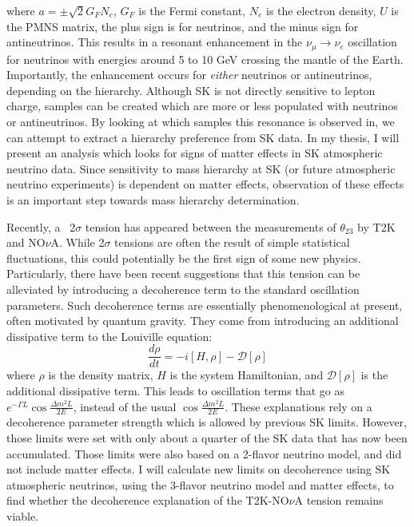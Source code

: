 \documentclass[12pt,oneside,openright]{article}
\begin{document}
where $a=\pm\sqrt{2}G_FN_e$, $G_F$ is the Fermi constant, $N_e$ is the electron density, $U$ is the PMNS matrix, the plus sign is for neutrinos, and the minus sign for antineutrinos.  This results in a resonant enhancement in the $\nu_\mu \rightarrow \nu_e$ oscillation for neutrinos with energies around 5 to 10 GeV crossing the mantle of the Earth.  Importantly, the enhancement occurs for \emph{either} neutrinos or antineutrinos, depending on the hierarchy.  Although SK is not directly sensitive to lepton charge, samples can be created which are more or less populated with neutrinos or antineutrinos.  By looking at which samples this resonance is observed in, we can attempt to extract a hierarchy preference from SK data.  In my thesis, I will present an analysis which looks for signs of matter effects in SK atmospheric neutrino data.  Since sensitivity to mass hierarchy at SK (or future atmospheric neutrino experiments) is dependent on matter effects, observation of these effects is an important step towards mass hierarchy determination.\par
Recently, a ~2$\sigma$ tension has appeared between the measurements of $\theta_{23}$ by T2K and NO$\nu$A.  While 2$\sigma$ tensions are often the result of simple statistical fluctuations, this could potentially be the first sign of some new physics.  Particularly, there have been recent suggestions that this tension can be alleviated by introducing a decoherence term to the standard oscillation parameters.  Such decoherence terms are essentially phenomenological at present, often motivated by quantum gravity.  They come from introducing an additional dissipative term to the Louiville equation:
\begin{equation}
\frac{d\rho}{dt}=-i[H,\rho]-\mathcal{D}[\rho]
\end{equation}
where $\rho$ is the density matrix, $H$ is the system Hamiltonian, and $\mathcal{D}[\rho]$ is the additional dissipative term.  This leads to oscillation terms that go as $e^{-\Gamma L} \cos \frac{\Delta m^2 L}{2E}$, instead of the usual $\cos \frac{\Delta m^2 L}{2E}$.     
These explanations rely on a decoherence parameter strength which is allowed by previous SK limits. However, those limits were set with only about a quarter of the SK data that has now been accumulated.  Those limits were also based on a 2-flavor neutrino model, and did not include matter effects.  I will calculate new limits on decoherence using SK atmospheric neutrinos, using the 3-flavor neutrino model and matter effects, to find whether the decoherence explanation of the T2K-NO$\nu$A tension remains viable.\par
\end{document}

